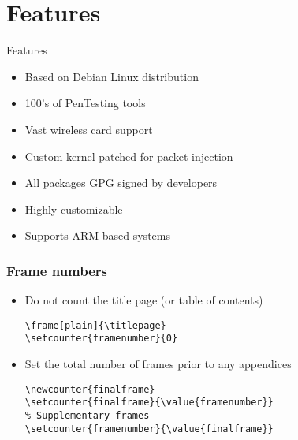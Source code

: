 \documentclass[xcolor=table]{beamer}
\begin{document}
\section{Features}

\begin{frame}{Features}
\medskip
\begin{itemize}
\item Based on Debian Linux distribution
\item 100's of PenTesting tools
\item Vast wireless card support
\item Custom kernel patched for packet injection
\item All packages GPG signed by developers
\item Highly customizable 
\item Supports ARM-based systems
\end{itemize}
\end{frame}


\setcounter{finalframe}{\value{framenumber}}

\begin{frame}[fragile]
\frametitle{Frame numbers}
\begin{itemize}
\item Do not count the title page (or table of contents) 
\begin{verbatim}
\frame[plain]{\titlepage}
\setcounter{framenumber}{0}
\end{verbatim}
\smallskip
\item Set the total number of frames prior to any appendices
\begin{verbatim}
\newcounter{finalframe}
\setcounter{finalframe}{\value{framenumber}}
% Supplementary frames
\setcounter{framenumber}{\value{finalframe}}
\end{verbatim}
\end{itemize}
\end{frame}

\setcounter{framenumber}{\value{finalframe}}
\end{document}
